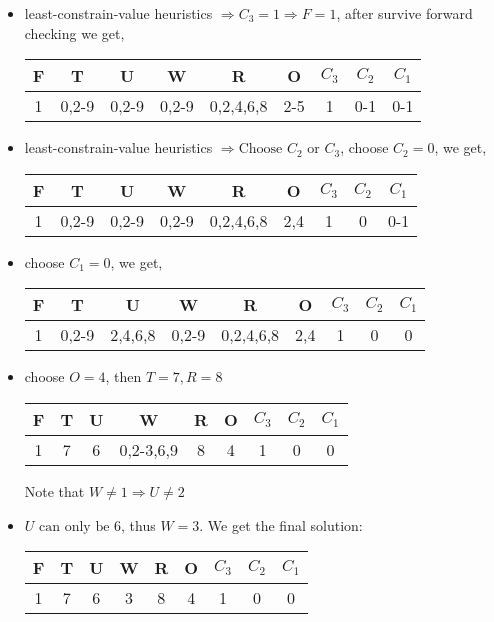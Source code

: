 \documentclass{mcmthesis}
\begin{document}
\begin{itemize}
	\item least-constrain-value heuristics $\Rightarrow C_3 = 1 \Rightarrow F=1$, after survive forward checking we get,
	
	\begin{tabular}{ccccccccc}
		\hline 
		F & T & U & W & R & O & $C_3$ & $C_2$ & $C_1$ \\ 
		\hline 
		1 & 0,2-9 & 0,2-9 &0,2-9 & 0,2,4,6,8 & 2-5 & 1 & 0-1 & 0-1 \\ 
		\hline 
	\end{tabular}
	
	\item  least-constrain-value heuristics $ \Rightarrow \text{Choose } C_2 \text{ or } C_3$, choose $C_2=0$, we get,
	
	\begin{tabular}{ccccccccc}
		\hline 
		F & T & U & W & R & O & $C_3$ & $C_2$ & $C_1$ \\ 
		\hline 
		1 & 0,2-9 & 0,2-9 &0,2-9 & 0,2,4,6,8 & 2,4 & 1 & 0 & 0-1 \\ 
		\hline 
	\end{tabular}
	
	\item choose $C_1=0$, we get, 
	 
	\begin{tabular}{ccccccccc}
		\hline 
		F & T & U & W & R & O & $C_3$ & $C_2$ & $C_1$ \\ 
		\hline 
		1 & 0,2-9 & 2,4,6,8 &0,2-9 & 0,2,4,6,8 &2,4 & 1 & 0 & 0 \\ 
		\hline 
	\end{tabular}
	
	\item choose $O=4$, then $T=7, R=8$
	
	\begin{tabular}{ccccccccc}
		\hline
		F & T &    U    &  W  & R & O & $C_3$ & $C_2$ & $C_1$ \\ \hline
		1 & 7 & 6 & 0,2-3,6,9 & 8 & 4 &   1   &   0   &   0   \\ \hline
	\end{tabular}
	
	 Note that $W \ne 1 \Rightarrow U \ne 2 $

	\item $U\text{ can only be }6$, thus $W=3$. We get the final solution:
	
		\begin{tabular}{ccccccccc}
		\hline
		F & T &    U    &  W  & R & O & $C_3$ & $C_2$ & $C_1$ \\ \hline
		1 & 7 & 6 & 3 & 8 & 4 &   1   &   0   &   0   \\ \hline
	\end{tabular}
	

\end{itemize}
\end{document}
